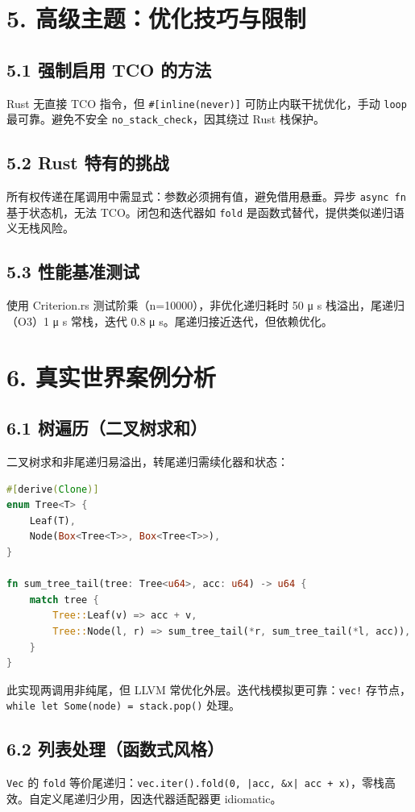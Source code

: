 \chapter{5. 高级主题：优化技巧与限制}
\section{5.1 强制启用 TCO 的方法}
Rust 无直接 TCO 指令，但 \texttt{\#{}[inline(never)]} 可防止内联干扰优化，手动 \texttt{loop} 最可靠。避免不安全 \texttt{no\_{}stack\_{}check}，因其绕过 Rust 栈保护。\par
\section{5.2 Rust 特有的挑战}
所有权传递在尾调用中需显式：参数必须拥有值，避免借用悬垂。异步 \texttt{async fn} 基于状态机，无法 TCO。闭包和迭代器如 \texttt{fold} 是函数式替代，提供类似递归语义无栈风险。\par
\section{5.3 性能基准测试}
使用 Criterion.rs 测试阶乘（n=10000），非优化递归耗时 50 μ s 栈溢出，尾递归（O3）1 μ s 常栈，迭代 0.8 μ s。尾递归接近迭代，但依赖优化。\par
\chapter{6. 真实世界案例分析}
\section{6.1 树遍历（二叉树求和）}
二叉树求和非尾递归易溢出，转尾递归需续化器和状态：\par
\begin{lstlisting}[language=rust]
#[derive(Clone)]
enum Tree<T> {
    Leaf(T),
    Node(Box<Tree<T>>, Box<Tree<T>>),
}

fn sum_tree_tail(tree: Tree<u64>, acc: u64) -> u64 {
    match tree {
        Tree::Leaf(v) => acc + v,
        Tree::Node(l, r) => sum_tree_tail(*r, sum_tree_tail(*l, acc)),
    }
}
\end{lstlisting}
此实现两调用非纯尾，但 LLVM 常优化外层。迭代栈模拟更可靠：\texttt{vec!} 存节点，\texttt{while let Some(node) = stack.pop()} 处理。\par
\section{6.2 列表处理（函数式风格）}
\texttt{Vec} 的 \texttt{fold} 等价尾递归：\texttt{vec.iter().fold(0, |acc, \&{}x| acc + x)}，零栈高效。自定义尾递归少用，因迭代器适配器更 idiomatic。\par
